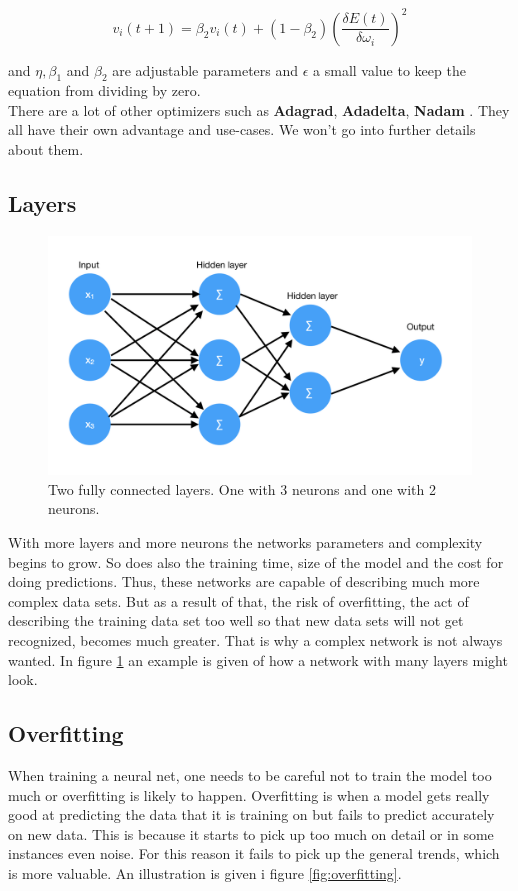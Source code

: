 \[ v_i (t+1) = \beta_2v_i(t) + (1 - \beta_2) (\frac{ \delta E(t) }{\delta\omega_i})^2 \]

and $ \eta, \beta_1 $ and $ \beta_2 $ are adjustable parameters and $ \epsilon $ a small value to keep the equation from dividing by zero.\\

There are a lot of other optimizers such as \textbf{Adagrad}, \textbf{Adadelta}, 
\textbf{Nadam} \cite{optimizers}. They all have their own advantage and use-cases.
We won't go into further details about them.

\subsection{Layers}

\begin{figure}[hbtp]
\begin{center}
\includegraphics[width = 1.0\textwidth]{./Images/fully_connected.jpg} 
\caption{Two fully connected layers. One with 3 neurons and one with 2 neurons.}
\label{fig:layers}
\end{center}
\end{figure}

With more layers and more neurons the networks parameters and complexity begins to grow. So does also the training time, size of the model and the cost for doing predictions. 
Thus, these networks are capable of describing much more complex data sets. But as a result of that, the risk of overfitting, the act of describing the training data set too well so that new data sets will not get recognized, becomes much greater.
That is why a complex network is not always wanted.
In figure \ref{fig:layers} an example is given of how a network with many layers might look.

\subsection{Overfitting}
\label{overfitting}
When training a neural net, one needs to be careful not to train the model too much or overfitting is likely to happen.
Overfitting is when a model gets really good at predicting the data that it is training on but fails to predict accurately on new data.
This is because it starts to pick up too much on detail or in some instances even noise.
For this reason it fails to pick up the general trends, which is more valuable.
An illustration is given i figure \ref{fig:overfitting}.

